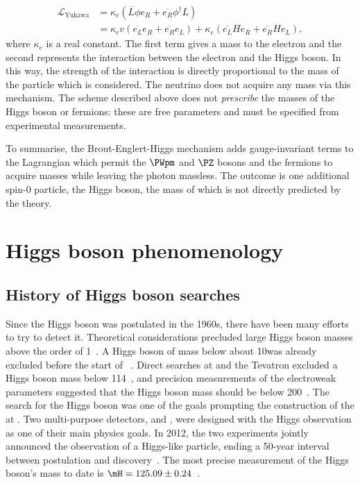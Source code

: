 \begin{equation}
\label{eq:th:yukawa_coupling}
\begin{split}
  \mathcal{L}_{\textrm{Yukawa}} &= \kappa_{e} (\overline{L} \phi  e_{R} + \overline{e_{R}} \phi^{\dagger} L )\\
                       &=  \kappa_{e} v (\overline{e_{L}} e_{R} + \overline{e_{R}} e_{L} ) +  \kappa_{e}   (\overline{e_{L}} H e_{R} + \overline{e_{R}} H e_{L} ),
\end{split}
\end{equation}
where $\kappa_{e}$ is a real constant. The first term gives a mass to the electron and the second represents the interaction between the electron and the Higgs boson. In this way, the strength of the interaction is directly proportional to the mass of the particle which is considered. The neutrino does not acquire any mass via this mechanism. The scheme described above does not \emph{prescribe} the masses of the Higgs boson or fermions: these are free parameters and must be specified from experimental measurements.

To summarise, the Brout-Englert-Higgs mechanism adds gauge-invariant terms to the \SM Lagrangian which permit the $\PWpm$ and $\PZ$ bosons and the fermions to acquire masses while leaving the photon massless. The outcome is one additional spin-0 particle, the Higgs boson, the mass of which is not directly predicted by the theory.

 
\section{Higgs boson phenomenology}
\subsection{History of Higgs boson searches}

Since the Higgs boson was postulated in the 1960s, there have been many efforts to try to detect it. Theoretical considerations precluded large Higgs boson masses above the order of 1\TeV~\cite{Heller:1993yv}. 
A Higgs boson of mass below about 10\GeV was already excluded before the start of \LEP~\cite{Wu:2014vva}.
Direct searches at \LEP and the Tevatron excluded a Higgs boson mass below 114\GeV~\cite{Barate:2003sz,TEVNPH:2012ab}, and precision measurements of the electroweak parameters suggested that the Higgs boson mass should be below 200\GeV~\cite{Renton:2004wd}. The search for the Higgs boson was one of the goals prompting the construction of the \LHC at \CERN. Two multi-purpose detectors, \ATLAS and \CMS, were designed with the Higgs observation as one of their main physics goals. In 2012, the two experiments jointly announced the observation of a Higgs-like particle, ending a 50-year interval between postulation and discovery~\cite{CMSHDisc,ATLASHDisc}. The most precise measurement of the Higgs boson's mass to date is $\mH=125.09\pm0.24$~\cite{PhysRevLett.114.191803}.

